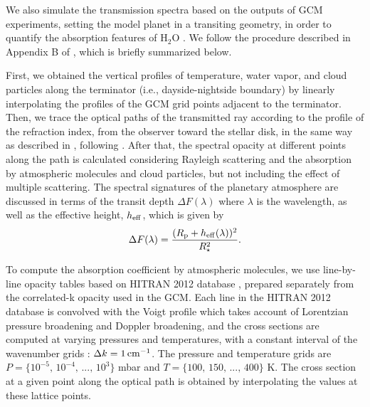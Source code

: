 \documentclass[11pt,numberedappendix,twocolappendix,]{emulateapj}
\def\water{H$_2$O }
\begin{document}
We also simulate the transmission spectra based on the outputs of GCM experiments, setting the model planet in a transiting geometry, in order to quantify the absorption features of \water.  
We follow the procedure described in Appendix B of \citet{Way2017}, which is briefly summarized below. 

First, we obtained the vertical profiles of temperature, water vapor, and cloud particles along the terminator (i.e., dayside-nightside boundary) by linearly interpolating the profiles of the GCM grid points adjacent to the terminator. 
Then, we trace the optical paths of the transmitted ray according to the profile of the refraction index, from the observer toward the stellar disk, in the same way as described in \citet{vanderWerf2008}, following \citet{Misra2014}. 
After that, the spectral opacity at different points along the path is calculated considering Rayleigh scattering and the absorption by atmospheric molecules and cloud particles, but not including the effect of multiple scattering. 
The spectral signatures of the planetary atmosphere are discussed in terms of the transit depth $\Delta F(\lambda )$ where $\lambda $ is the wavelength, as well as the effective height, $h_{\rm eff}$, which is given by
\begin{equation}
\Delta F(\lambda) = \frac{( R_{\rm p} + h_{\rm eff}(\lambda)  )^2}{R_{\star }^2}. 
\end{equation}

To compute the absorption coefficient by atmospheric molecules, we use line-by-line opacity tables based on HITRAN 2012 database \citep{Rothman2013}, prepared separately from the correlated-k opacity used in the GCM. 
Each line in the HITRAN 2012 database is convolved with the Voigt profile which takes account of Lorentzian pressure broadening and Doppler broadening, 
and the cross sections are computed at varying pressures and temperatures, with a constant interval of the wavenumber grids : $\Delta k = 1\,{\rm cm}^{-1}$. 
The pressure and temperature grids are $P = \{10^{-5},\, 10^{-4},\,...,\,10^3\}$ mbar and $T = \{100,\, 150,\,...,\, 400\}$ K. 
The cross section at a given point along the optical path is obtained by interpolating the values at these lattice points. 
\end{document}
